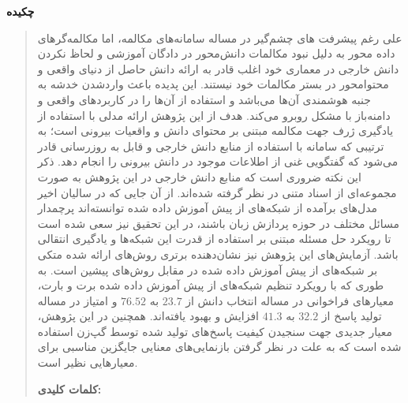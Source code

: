 \thispagestyle{empty}
\centerline{\textbf{\large{چکیده}}}
\begin{quote}

	علی رغم پیشرفت های چشم‌گیر
	در مساله سامانه‌های مکالمه، اما مکالمه‌گر‌های داده محور 
	به دلیل نبود مکالمات دانش‌محور در دادگان آموزشی و لحاظ نکردن دانش خارجی در معماری خود 
	اغلب قادر به ارائه دانش حاصل از دنیای واقعی و محتوامحور در بستر مکالمات خود نیستند. این پدیده باعث واردشدن خدشه به جنبه هوشمندی آن‌ها می‌باشد و استفاده از آن‌ها را در کاربردهای واقعی
	و دامنه‌باز
	با مشکل روبرو می‌کند.
	\newline  
	هدف از این پژوهش ارائه مدلی با استفاده از یادگیری ژرف جهت مکالمه مبتنی بر محتوای دانش و واقعیات بیرونی است؛ به ترتیبی که سامانه با استفاده از منابع دانش خارجی و قابل به روزرسانی قادر می‌شود که گفتگویی غنی از اطلاعات موجود در دانش بیرونی را انجام دهد. ذکر این نکته ضروری است که منابع دانش خارجی در این پژوهش به صورت مجموعه‌ای از اسناد متنی در نظر گرفته شده‌اند.
	\newline
	از آن جایی که در سالیان اخیر مدل‌های برآمده از شبکه‌های از پیش آموزش داده شده توانسته‌اند پرچمدار مسائل مختلف در حوزه پردازش زبان باشند، در این تحقیق نیز سعی شده است تا رویکرد حل مسئله مبتنی بر استفاده از قدرت این شبکه‌ها و یادگیری انتقالی باشد. آزمایش‌های این پژوهش  نیز نشان‌دهنده برتری روش‌های ارائه شده متکی بر شبکه‌های از پیش آموزش داده شده در مقابل روش‌های پیشین است.
	به طوری که با رویکرد تنظیم شبکه‌های 
	از پیش آموزش داده شده برت و بارت،
	 معیارهای فراخوانی در مساله انتخاب دانش از 
	$23.7$
	 به 
	 $76.52$
	  و امتیاز 
	در مساله تولید پاسخ از 
	$32.2$
	 به 
	 $41.3$
	  افزایش و بهبود یافته‌اند. همچنین در این پژوهش، معیار جدیدی جهت سنجیدن کیفیت پاسخ‌های تولید شده توسط گپ‌زن استفاده 
	  شده
	  است که به علت در نظر گرفتن بازنمایی‌های معنایی جایگزین مناسبی برای معیارهایی نظیر 
	  است. 
	
	\vskip 1cm
	\textbf{کلمات کلیدی:} 
\end{quote}
